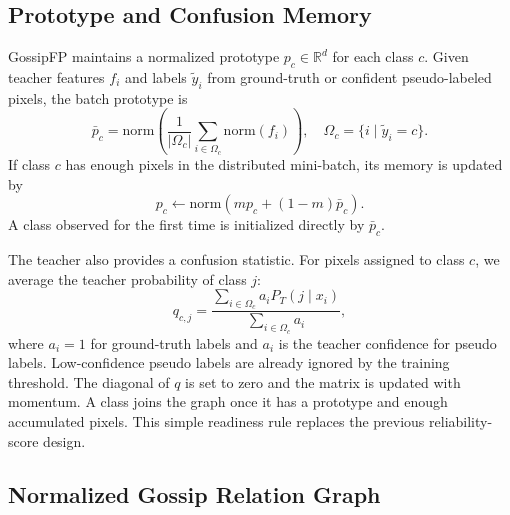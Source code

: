 \documentclass[10pt,twocolumn,letterpaper]{article}
\begin{document}
\subsection{Prototype and Confusion Memory}

GossipFP maintains a normalized prototype $p_c \in \mathbb{R}^d$ for each class $c$. Given teacher features $f_i$ and labels $\tilde{y}_i$ from ground-truth or confident pseudo-labeled pixels, the batch prototype is
\begin{equation}
    \bar{p}_c =
    \mathrm{norm}
    \left(
    \frac{1}{|\Omega_c|}
    \sum_{i \in \Omega_c}
    \mathrm{norm}(f_i)
    \right),
    \quad
    \Omega_c=\{i \mid \tilde{y}_i=c\}.
\end{equation}
If class $c$ has enough pixels in the distributed mini-batch, its memory is updated by
\begin{equation}
    p_c \leftarrow \mathrm{norm}\left(m p_c + (1-m)\bar{p}_c\right).
\end{equation}
A class observed for the first time is initialized directly by $\bar{p}_c$.

The teacher also provides a confusion statistic. For pixels assigned to class $c$, we average the teacher probability of class $j$:
\begin{equation}
    q_{c,j} =
    \frac{\sum_{i \in \Omega_c} a_i P_T(j\mid x_i)}
    {\sum_{i \in \Omega_c} a_i},
\end{equation}
where $a_i=1$ for ground-truth labels and $a_i$ is the teacher confidence for pseudo labels. Low-confidence pseudo labels are already ignored by the training threshold. The diagonal of $q$ is set to zero and the matrix is updated with momentum. A class joins the graph once it has a prototype and enough accumulated pixels. This simple readiness rule replaces the previous reliability-score design.

\subsection{Normalized Gossip Relation Graph}
\end{document}
